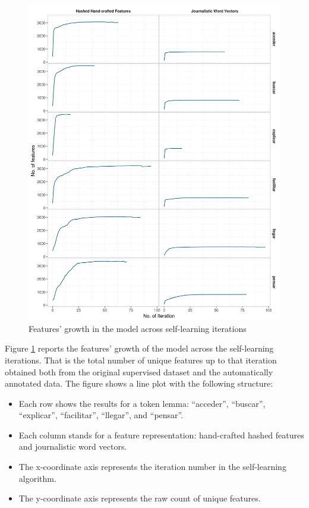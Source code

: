 \begin{figure}[htb!]
  \centering
  \includegraphics[height=.9\textheight,width=\textwidth,keepaspectratio]
    {plots/selflearning/features_growth_total}
  \caption{Features' growth in the model across self-learning iterations}
  \label{fig:self-learning:features_growth_total}
\end{figure}

Figure \ref{fig:self-learning:features_growth_total} reports the features'
growth of the model across the self-learning iterations. That is the total
number of unique features up to that iteration obtained both from the original
supervised dataset and the automatically annotated data. The figure shows a
line plot with the following structure:

\begin{itemize}
  \item Each row shows the results for a token lemma: ``acceder'', ``buscar'',
    ``explicar'', ``facilitar'', ``llegar'', and ``pensar''.
  \item Each column stands for a feature representation: hand-crafted hashed
    features and journalistic word vectors.
  \item The x-coordinate axis represents the iteration number in the
    self-learning algorithm.
  \item The y-coordinate axis represents the raw count of unique features.
\end{itemize}

